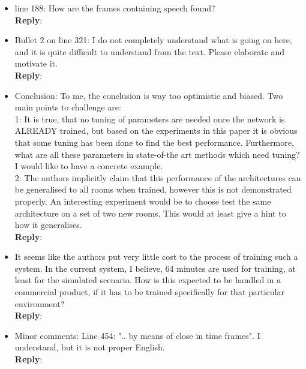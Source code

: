 \documentclass[11pt, technote, letterpaper, oneside, onecolumn]{IEEEtran}
\begin{document}
\begin{itemize}
\item line 188: How are the frames containing speech found?\\
\textbf{Reply}:

\item Bullet 2 on line 321: I do not completely understand what is going on here, and it is quite difficult to understand from the text. Please elaborate and motivate it.\\
\textbf{Reply}:

\item Conclusion: To me, the conclusion is way too optimistic and biased. Two main points to challenge are:\\
 1: It is true, that no tuning of parameters are needed once the network is ALREADY trained, but based on the experiments in this paper it is obvious that some tuning has been done to find the best performance. Furthermore, what are all these parameters in state-of-the art methods which need tuning? I would like to have a concrete example.\\
 2: The authors implicitly claim that this performance of the architectures can be generalised to all rooms when trained, however this is not demonstrated properly. An interesting experiment would be to choose test the same architecture on a set of two new rooms. This would at least give a hint to how it generalises.\\
 \textbf{Reply}:

\item It seems like the authors put very little cost to the process of training such a system. In the current system, I believe, 64 minutes are used for training, at least for the simulated scenario. How is this expected to be handled in a commercial product, if it has to be trained specifically for that particular environment?\\
\textbf{Reply}:

\item Minor comments: Line 454: ".. by means of close in time frames". I understand, but it is not proper English.\\
\textbf{Reply}:
\end{itemize}

\newpage
\end{document}
